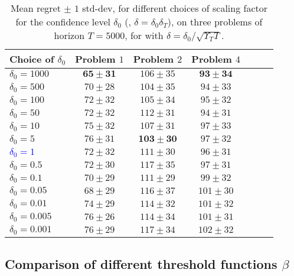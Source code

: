 \begin{table}[ht]
    \centering
    \begin{tabular}{l|cccccc}
        \textbf{Choice of} $\delta_0$ & Problem $1$ & Problem $2$ & Problem $4$ \\
        \hline
        $\delta_0=1000$       & $\mathbf{65 \pm 31}$ & $106 \pm 35$ & $\mathbf{93 \pm 34}$ \\
        $\delta_0=500$        & $70 \pm 28$ & $104 \pm 35$ & $94 \pm 33$ \\
        $\delta_0=100$        & $72 \pm 32$ & $105 \pm 34$ & $95 \pm 32$ \\
        $\delta_0=50$         & $72 \pm 32$ & $112 \pm 31$ & $94 \pm 31$ \\
        $\delta_0=10$         & $75 \pm 32$ & $107 \pm 31$ & $97 \pm 33$ \\
        $\delta_0=5$          & $76 \pm 31$ & $\mathbf{103 \pm 30}$ & $97 \pm 32$ \\
        \textcolor{blue}{$\delta_0=1$}  & $72 \pm 32$ & $111 \pm 30$ & $96 \pm 31$ \\
        $\delta_0=0.5$        & $72 \pm 30$ & $117 \pm 35$ & $97 \pm 31$ \\
        $\delta_0=0.1$        & $70 \pm 29$ & $111 \pm 29$ & $99 \pm 32$ \\
        $\delta_0=0.05$       & $68 \pm 29$ & $116 \pm 37$ & $101 \pm 30$ \\
        $\delta_0=0.01$       & $74 \pm 29$ & $114 \pm 32$ & $101 \pm 32$ \\
        $\delta_0=0.005$      & $76 \pm 26$ & $114 \pm 34$ & $101 \pm 31$ \\
        $\delta_0=0.001$      & $76 \pm 29$ & $117 \pm 34$ & $102 \pm 32$
    \end{tabular}
    \caption{Mean regret $\pm$ $1$ std-dev, for different choices of scaling factor for the confidence level $\delta_0$ (\ie, $\delta=\delta_0 \delta_T$), on three problems of horizon $T=5000$, for \GLRklUCB{} with $\delta=\delta_0 / \sqrt{\Upsilon_T T}$.}
    \label{table:6:sensibilityDelta}
\end{table}


\subsection{Comparison of different threshold functions $\beta$}\label{sec:6:exploringDifferentThresholdFunctions}

